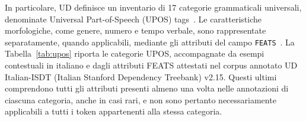 \documentclass[12pt,a4paper]{report}
\begin{document}
In particolare, UD definisce un inventario di 17 categorie grammaticali universali, denominate Universal Part-of-Speech (UPOS) tags~\cite{upos}. Le caratteristiche morfologiche, come genere, numero e tempo verbale, sono rappresentate separatamente, quando applicabili, mediante gli attributi del campo \texttt{FEATS}~\cite{conllu}. La Tabella~\ref{tab:upos} riporta le categorie UPOS, accompagnate da esempi contestuali in italiano e dagli attributi FEATS attestati nel corpus annotato UD Italian-ISDT (Italian Stanford Dependency Treebank) v2.15. Questi ultimi comprendono tutti gli attributi presenti almeno una volta nelle annotazioni di ciascuna categoria, anche in casi rari, e non sono pertanto necessariamente applicabili a tutti i token appartenenti alla stessa categoria.

\begingroup
\footnotesize
\setlength{\LTpre}{6pt}
\setlength{\LTpost}{6pt}
\setlength{\tabcolsep}{4pt}
\newcommand{\rowseparator}{%
    \arrayrulecolor{black!20}%
    \midrule
    \arrayrulecolor{black}%
}
\end{document}
